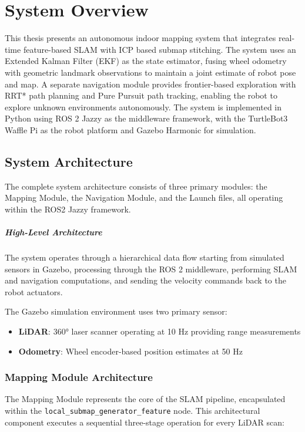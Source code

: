 \documentclass[11pt]{article}
\begin{document}
\section{System Overview}

This thesis presents an autonomous indoor mapping system that integrates real-time feature-based SLAM with ICP based submap stitching. The system uses an Extended Kalman Filter (EKF) as the state estimator, fusing wheel odometry with geometric landmark observations to maintain a joint estimate of robot pose and map. A separate navigation module provides frontier-based exploration with RRT* path planning and Pure Pursuit path tracking, enabling the robot to explore unknown environments autonomously. The system is implemented in Python using ROS 2 Jazzy as the middleware framework, with the TurtleBot3 Waffle Pi as the robot platform and Gazebo Harmonic for simulation.

\subsection{System Architecture}

The complete system architecture consists of three primary modules: the Mapping Module, the Navigation Module, and the Launch files, all operating within the ROS2 Jazzy framework.

\subparagraph{High-Level Architecture}

The system operates through a hierarchical data flow starting from simulated sensors in Gazebo, processing through the ROS 2 middleware, performing SLAM and navigation computations, and sending the velocity commands back to the robot actuators. 

The Gazebo simulation environment uses two primary sensor:
\begin{itemize}
	\item \textbf{LiDAR}: 360° laser scanner operating at 10 Hz providing range measurements
	\item \textbf{Odometry}: Wheel encoder-based position estimates at 50 Hz
	
\end{itemize}


\subsubsection{Mapping Module Architecture}

The Mapping Module represents the core of the SLAM pipeline, encapsulated within the \texttt{local\_submap\_generator\_feature} node. This architectural component executes a sequential three-stage operation for every LiDAR scan:
\end{document}
